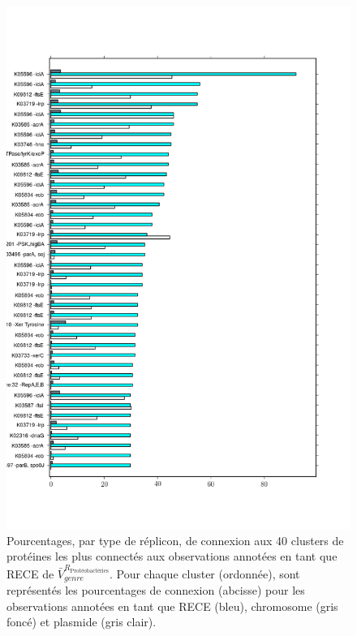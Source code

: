 \begin{figure}[H]
\hspace{-2cm}
\includegraphics[trim=0cm 1cm 0cm 0cm,clip,width=\textwidth]{./img/cluster_connectivity.png}
\caption[Pourcentages de connexion aux clusters de protéines par type de réplicon]{Pourcentages, par type de réplicon, de connexion aux 40 clusters de protéines les plus connectés aux observations annotées en tant que RECE de $\bar{V}^{R_{\textrm{Protéobactéries}}}_{genre}$. Pour chaque cluster (ordonnée), sont représentés les pourcentages de connexion (abcisse) pour les observations annotées en tant que RECE (bleu), chromosome (gris foncé) et plasmide (gris clair).}\label{figconnectiv}
\end{figure} 

